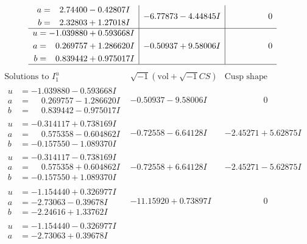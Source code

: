 \documentclass[1p]{elsarticle_modified}
\theoremstyle{definition}
\newcommand{\I}{\sqrt{-1}}
\begin{document}
$$\begin{array}{c|c|c}
\begin{aligned}
a &= \phantom{-}2.74400 - 0.42807 I \\
b &= \phantom{-}2.32803 + 1.27018 I\end{aligned}
 & -6.77873 - 4.44845 I & \phantom{-0.000000 } 0 \\ \hline\begin{aligned}
u &= -1.039880 + 0.593668 I \\
a &= \phantom{-}0.269757 + 1.286620 I \\
b &= \phantom{-}0.839442 + 0.975017 I\end{aligned}
 & -0.50937 + 9.58006 I & \phantom{-0.000000 } 0\\
 \hline 
 \end{array}$$\newpage$$\begin{array}{c|c|c}  
\text{Solutions to }I^u_{1}& \I (\text{vol} + \sqrt{-1}CS) & \text{Cusp shape}\\
 \hline 
\begin{aligned}
u &= -1.039880 - 0.593668 I \\
a &= \phantom{-}0.269757 - 1.286620 I \\
b &= \phantom{-}0.839442 - 0.975017 I\end{aligned}
 & -0.50937 - 9.58006 I & \phantom{-0.000000 } 0 \\ \hline\begin{aligned}
u &= -0.314117 + 0.738169 I \\
a &= \phantom{-}0.575358 - 0.604862 I \\
b &= -0.157550 - 1.089370 I\end{aligned}
 & -0.72558 - 6.64128 I & -2.45271 + 5.62875 I \\ \hline\begin{aligned}
u &= -0.314117 - 0.738169 I \\
a &= \phantom{-}0.575358 + 0.604862 I \\
b &= -0.157550 + 1.089370 I\end{aligned}
 & -0.72558 + 6.64128 I & -2.45271 - 5.62875 I \\ \hline\begin{aligned}
u &= -1.154440 + 0.326977 I \\
a &= -2.73063 - 0.39678 I \\
b &= -2.24616 + 1.33762 I\end{aligned}
 & -11.15920 + 0.73897 I & \phantom{-0.000000 } 0 \\ \hline\begin{aligned}
u &= -1.154440 - 0.326977 I \\
a &= -2.73063 + 0.39678 I \\

\end{aligned}
\end{array}$$
\end{document}
